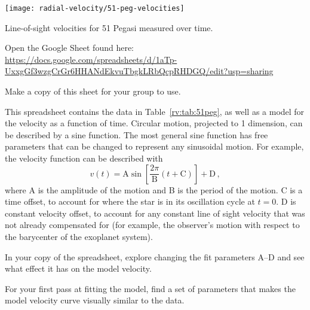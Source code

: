 \begin{table}
	\centering
	\texttt{[image: radial-velocity/51-peg-velocities]}
	\caption{Line-of-sight velocities for 51 Pegasi measured over time.}\label{rv:tab:51peg}
\end{table}

\begin{steps}
	\item Open the Google Sheet found here: \url{https://docs.google.com/spreadsheets/d/1aTp-UxxgGf3wzgCrGr6HHANdEkvuTbgkLRbQcpRHDGQ/edit?usp=sharing}
	
	\item Make a copy of this sheet for your group to use.
\end{steps}

This spreadsheet contains the data in Table~\ref{rv:tab:51peg}, as well as a model for the velocity as a function of time. Circular motion, projected to 1 dimension, can be described by a sine function. The most general sine function has free parameters that can be changed to represent any sinusoidal motion. For example, the velocity function can be described with
\begin{equation}
 v(t) = \textrm{A} \sin \left[\frac{2 \pi}{\textrm{B}}\left(t + \textrm{C}\right)\right] + \textrm{D} \,,
\end{equation}
where A is the amplitude of the motion and B is the period of the motion. C is a time offset, to account for where the star is in its oscillation cycle at $t=0$. D is constant velocity offset, to account for any constant line of sight velocity that was not already compensated for (for example, the observer's motion with respect to the barycenter of the exoplanet system).


%

\begin{steps}
	\item In your copy of the spreadsheet, explore changing the fit parameters A--D and see what effect it has on the model velocity.
	
	\item For your first pass at fitting the model, find a set of parameters that makes the model velocity curve visually similar to the data.
\end{steps}

